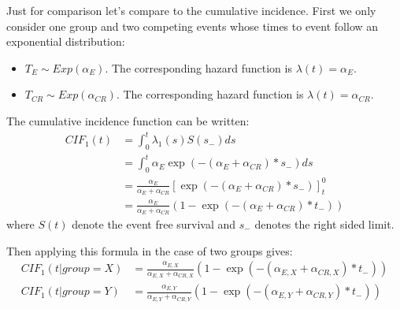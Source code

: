 \documentclass[12pt]{article}
\begin{document}
Just for comparison let's compare to the cumulative incidence. First
we only consider one group and two competing events whose times to
event follow an exponential distribution:
\begin{itemize}
\item \(T_E \sim Exp(\alpha_E)\). The corresponding hazard function is \(\lambda(t)=\alpha_E\).
\item \(T_{CR} \sim Exp(\alpha_{CR})\). The corresponding hazard function is \(\lambda(t)=\alpha_{CR}\).
\end{itemize}
The cumulative incidence function can be written:
\begin{align*}
CIF_1(t) &= \int_0^t \lambda_1(s) S(s_-) ds \\
&= \int_0^t \alpha_E \exp(- (\alpha_E + \alpha_{CR}) * s_-) ds \\
&= \frac{\alpha_E}{\alpha_E + \alpha_{CR}} \left[ \exp(- (\alpha_E + \alpha_{CR}) * s_-)\right]_t^0 \\
&= \frac{\alpha_E}{\alpha_E + \alpha_{CR}} \left(1 - \exp(- (\alpha_E + \alpha_{CR}) * t_-)\right) 
\end{align*}
where \(S(t)\) denote the event free survival and \(s_-\) denotes the right sided limit.

\bigskip

Then applying this formula in the case of two groups gives:
\begin{align*}
CIF_1(t|group = X) &= \frac{\alpha_{E,X}}{\alpha_{E,X} + \alpha_{CR,X}} \left(1 - \exp(- (\alpha_{E,X} + \alpha_{CR,X}) * t_-)\right) \\
CIF_1(t|group = Y) &= \frac{\alpha_{E,Y}}{\alpha_{E,Y} + \alpha_{CR,Y}} \left(1 - \exp(- (\alpha_{E,Y} + \alpha_{CR,Y}) * t_-)\right) 
\end{align*}

\clearpage
\end{document}
